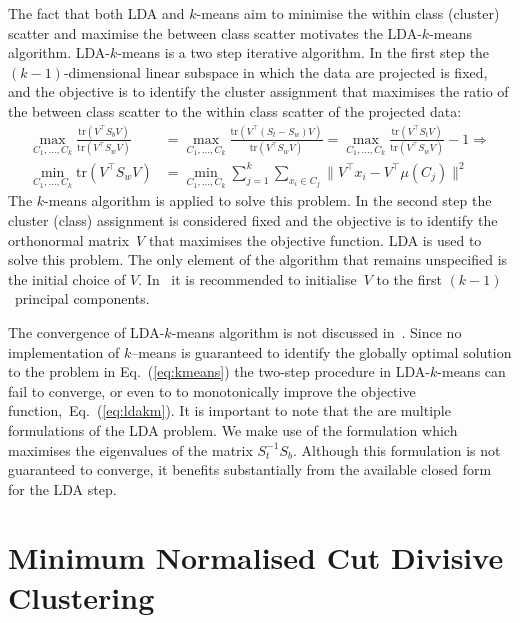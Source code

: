 \documentclass{book}
\def\tr#1{\mathrm{tr}\left(#1\right)}
\begin{document}
The fact that both LDA and $k$-means aim to minimise the within class (cluster)
scatter and maximise the between class scatter motivates the LDA-$k$-means
algorithm. 
%
LDA-$k$-means is a two step iterative algorithm. In the first step the
$(k-1)$-dimensional linear subspace in which the data are projected is
fixed, and the objective is to identify the cluster assignment that maximises
the ratio of the between class scatter to the within class scatter of the
projected data:
%
\begin{align*}
%
\max_{C_1,\ldots,C_k} \frac{\tr{V^\top S_b V}}{\tr{V^\top S_w V}} & = 
%
\max_{C_1,\ldots,C_k} \frac{\tr{V^\top (S_t - S_w) V}}{\tr{V^\top S_w V}} = 
%
\max_{C_1,\ldots,C_k} \frac{\tr{V^\top S_t V}}{\tr{V^\top S_w V}} -1 \Rightarrow \\
%
\min_{C_1,\ldots,C_k} \tr{V^\top S_w V} & = \min_{C_1,\ldots,C_k} \sum_{j=1}^k \sum_{x_i \in C_j} \|V^\top x_i - V^\top \mu(C_j)\|^2
%
\end{align*}
%
The $k$-means algorithm is applied to solve this problem.
%
In the second step the cluster (class) assignment is considered fixed and
the objective is to identify the orthonormal matrix~$V$ that maximises
the objective function. LDA is used to solve this problem.
The only element of the algorithm that remains
unspecified is the initial choice of $V$. In~\cite{DingL2007} it is
recommended to initialise~$V$ to the first $(k-1)$~principal components.


The convergence of LDA-$k$-means algorithm is not discussed
in~\cite{DingL2007}.
%
Since no implementation of $k$--means is guaranteed to identify the
globally optimal solution to the problem in Eq.~(\ref{eq:kmeans}) the two-step
procedure in LDA-$k$-means can fail to converge, or even to to
monotonically improve the objective function,~Eq.~(\ref{eq:ldakm}). 
%
It is important to note that the are multiple formulations of the LDA problem.
We make use of the formulation which maximises the eigenvalues of the matrix
$S_t^{-1}S_b$. Although this formulation is not guaranteed to converge, it
benefits substantially from the available closed form for the LDA step. 



\section{Minimum Normalised Cut Divisive Clustering}
\end{document}
